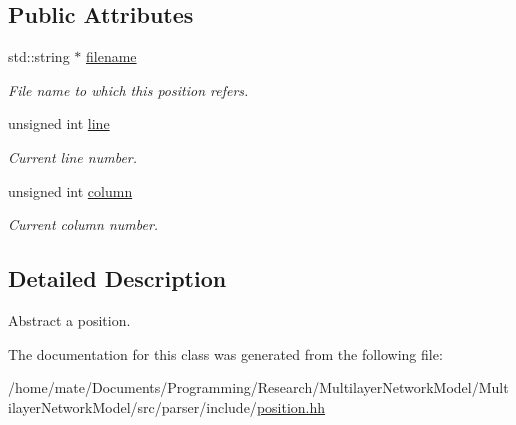 \subsection*{Public Attributes}
\begin{DoxyCompactItemize}
\item 
std\+::string $\ast$ \hyperlink{classEzAquarii_1_1position_a6baebe5ccaa956fa5b9fd2e1851afb39}{filename}\hypertarget{classEzAquarii_1_1position_a6baebe5ccaa956fa5b9fd2e1851afb39}{}\label{classEzAquarii_1_1position_a6baebe5ccaa956fa5b9fd2e1851afb39}

\begin{DoxyCompactList}\small\item\em File name to which this position refers. \end{DoxyCompactList}\item 
unsigned int \hyperlink{classEzAquarii_1_1position_ac437c157539d3a79fedc4a12a3a3d511}{line}\hypertarget{classEzAquarii_1_1position_ac437c157539d3a79fedc4a12a3a3d511}{}\label{classEzAquarii_1_1position_ac437c157539d3a79fedc4a12a3a3d511}

\begin{DoxyCompactList}\small\item\em Current line number. \end{DoxyCompactList}\item 
unsigned int \hyperlink{classEzAquarii_1_1position_a165dc16ad20b1e15c57bee1851f14a91}{column}\hypertarget{classEzAquarii_1_1position_a165dc16ad20b1e15c57bee1851f14a91}{}\label{classEzAquarii_1_1position_a165dc16ad20b1e15c57bee1851f14a91}

\begin{DoxyCompactList}\small\item\em Current column number. \end{DoxyCompactList}\end{DoxyCompactItemize}


\subsection{Detailed Description}
Abstract a position. 

The documentation for this class was generated from the following file\+:\begin{DoxyCompactItemize}
\item 
/home/mate/\+Documents/\+Programming/\+Research/\+Multilayer\+Network\+Model/\+Multilayer\+Network\+Model/src/parser/include/\hyperlink{position_8hh}{position.\+hh}\end{DoxyCompactItemize}
